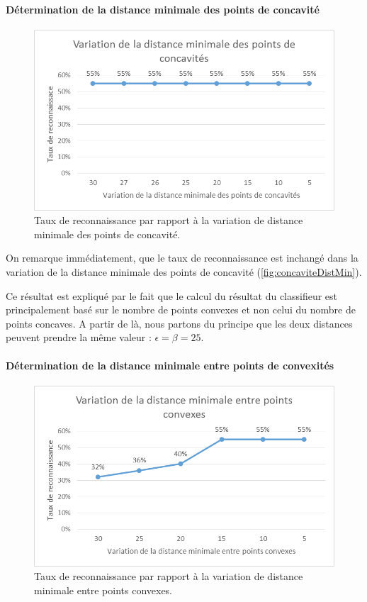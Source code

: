 \paragraph{Détermination de la distance minimale des points de concavité}
\begin{figure}[htb!]
\centerline{\includegraphics{concaviteDistMin.png}}
\caption{Taux de reconnaissance par rapport à la variation de distance minimale des points de concavité.}
\label{fig:concaviteDistMin}
\end{figure}

On remarque immédiatement, que le taux de reconnaissance est inchangé dans la variation de la distance minimale des points de concavité (\autoref{fig:concaviteDistMin}).

Ce résultat est expliqué par le fait que le calcul du résultat du classifieur est principalement basé sur le nombre de points convexes et non celui du nombre de points concaves. A partir de là, nous partons du principe que les deux distances peuvent prendre la même valeur : $\epsilon = \beta = 25$.

\paragraph{Détermination de la distance minimale entre points de convexités}
\begin{figure}[htb!]
\centerline{\includegraphics{convexiteEntreMin.png}}
\caption{Taux de reconnaissance par rapport à la variation de distance minimale entre points convexes.}
\label{fig:convexiteEntreMin}
\end{figure}

